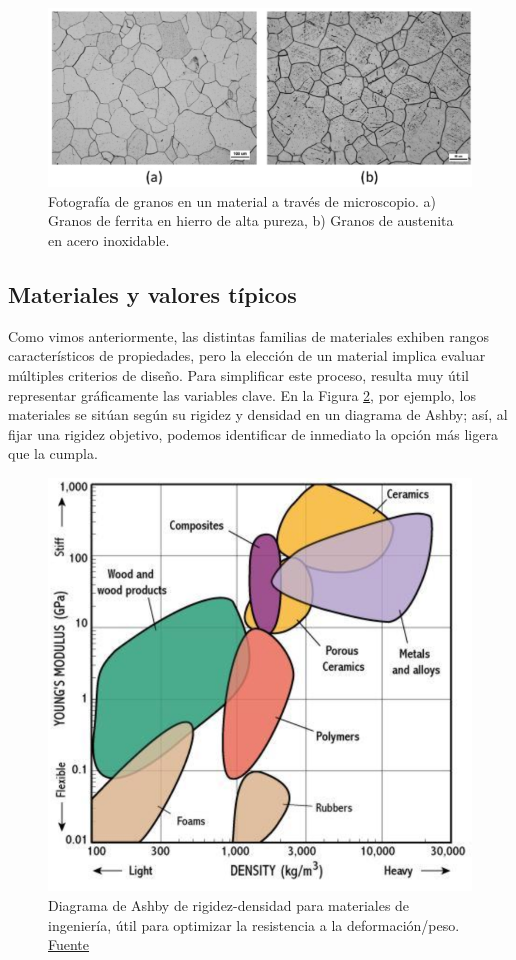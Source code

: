 \begin{figure}[h!]
    \centering
    \includegraphics[width=1.0\linewidth]{imgs/micr.png}
    \caption{Fotografía de granos en un material a través de microscopio. a) Granos de ferrita en hierro de alta pureza, b) Granos de austenita en acero inoxidable.\cite{acers}}
    \label{mic}
\end{figure}

\subsection{Materiales y valores típicos}

Como vimos anteriormente, las distintas familias de materiales exhiben rangos característicos de propiedades, pero la elección de un material implica evaluar múltiples criterios de diseño. Para simplificar este proceso, resulta muy útil representar gráficamente las variables clave. En la Figura \ref{props}, por ejemplo, los materiales se sitúan según su rigidez y densidad en un diagrama de Ashby; así, al fijar una rigidez objetivo, podemos identificar de inmediato la opción más ligera que la cumpla.

\begin{figure}[h!]
    \centering
    \includegraphics[width=0.6\linewidth]{imgs/comp.png}
    \caption{Diagrama de Ashby de rigidez-densidad para materiales de ingeniería, útil para optimizar la resistencia a la deformación/peso. \href{http://www-materials.eng.cam.ac.uk/mpsite/interactive_charts/}{Fuente}}
    \label{props}
\end{figure}

